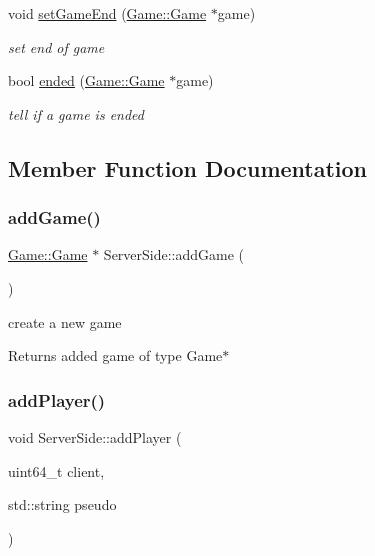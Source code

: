 \begin{DoxyCompactItemize}
void \hyperlink{class_server_side_ad58733f3a8e9be350be5631da88eaeaf}{set\+Game\+End} (\hyperlink{class_game_1_1_game}{Game\+::\+Game} $\ast$game)
\begin{DoxyCompactList}\small\item\em set end of game \end{DoxyCompactList}\item 
bool \hyperlink{class_server_side_a3c544d9bae62d9fa147c9fb60f9f21f6}{ended} (\hyperlink{class_game_1_1_game}{Game\+::\+Game} $\ast$game)
\begin{DoxyCompactList}\small\item\em tell if a game is ended \end{DoxyCompactList}\end{DoxyCompactItemize}


\subsection{Member Function Documentation}
\mbox{\label{class_server_side_a5f3536e4bd9f33730fe85fd19869a30e}} 
\subsubsection{\texorpdfstring{add\+Game()}{addGame()}}
{\footnotesize\ttfamily \hyperlink{class_game_1_1_game}{Game\+::\+Game} $\ast$ Server\+Side\+::add\+Game (\begin{DoxyParamCaption}{ }\end{DoxyParamCaption})}



create a new game 

\begin{DoxyReturn}{Returns}
added game of type Game$\ast$ 
\end{DoxyReturn}
\mbox{\label{class_server_side_a7262ec7d1a2574b79879b3d83f16d0e6}} 
\subsubsection{\texorpdfstring{add\+Player()}{addPlayer()}}
{\footnotesize\ttfamily void Server\+Side\+::add\+Player (\begin{DoxyParamCaption}\item[{uint64\+\_\+t}]{client,  }\item[{std\+::string}]{pseudo }\end{DoxyParamCaption})}



